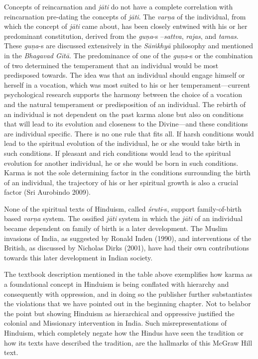 Concepts of reincarnation and \textit{jāti} do not have a complete correlation with reincarnation pre-dating the concepts of \textit{jāti}. The \textit{varṇa} of the individual, from which the concept of \textit{jāti} came about, has been closely entwined with his or her predominant constitution, derived from the \hbox{\textit{guṇa}}-s –\textit{sattva}, \textit{rajas}, and \textit{tamas}. These \textit{guṇa}-s are discussed extensively in the \textit{Sāṁkhyā} philosophy and mentioned in the \textit{Bhagavad Gītā}. The predominance of one of the \textit{guṇa}-s or the combination of two determined the temperament that an individual would be most predisposed towards. The idea was that an individual should engage himself or herself in a vocation, which was most suited to his or her temperament—current psychological research supports the harmony between the choice of a vocation and the natural temperament or predisposition of an individual. The rebirth of an individual is not dependent on the past karma alone but also on conditions that will lead to its evolution and closeness to the Divine—and these conditions are individual specific. There is no one rule that fits all. If harsh conditions would lead to the spiritual evolution of the individual, he or she would take birth in such conditions. If pleasant and rich conditions would lead to the spiritual evolution for another individual, he or she would be born in such conditions. Karma is not the sole determining factor in the conditions surrounding the birth of an individual, the trajectory of his or her spiritual growth is also a crucial factor (Sri Aurobindo 2009). 

None of the spiritual texts of Hinduism, called \textit{śruti}-s,  support family-of-birth based \textit{varṇa} system. The ossified \textit{jāti} system in which the \textit{jāti} of an individual became dependent on family of birth is a later development. The Muslim invasions of India, as suggested by Ronald Inden (1990), and interventions of the British, as discussed by Nicholas Dirks (2001), have had their own contributions towards this later development in Indian society. 

The textbook description mentioned in the table above exemplifies how karma as a foundational concept in Hinduism is being conflated with hierarchy and consequently with oppression, and in doing so the publisher further substantiates the violations that we have pointed out in the beginning chapter. Not to belabor the point but showing Hinduism as hierarchical and oppressive justified the colonial and Missionary intervention in India. Such misrepresentations of Hinduism, which completely negate how the Hindus have seen the tradition or how its texts have described the tradition, are the hallmarks of this McGraw Hill text.

